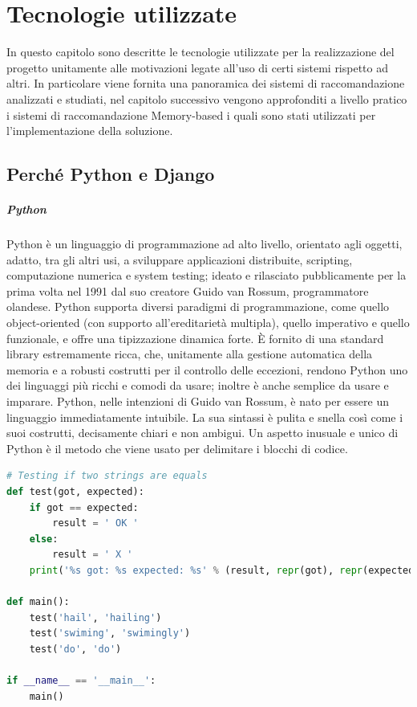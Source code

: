 \chapter{Tecnologie utilizzate}\label{chp:02-technologies}
In questo capitolo sono descritte le tecnologie utilizzate per la realizzazione del progetto unitamente alle motivazioni legate all'uso 
di certi sistemi rispetto ad altri. In particolare viene fornita una panoramica dei sistemi di raccomandazione analizzati e studiati,
nel capitolo successivo vengono approfonditi a livello pratico i sistemi di raccomandazione Memory-based i quali sono stati utilizzati 
per l'implementazione della soluzione.
%
\section{Perché Python e Django}
\paragraph{Python}
Python è un linguaggio di programmazione ad alto livello, orientato agli oggetti, adatto, tra gli altri usi, a sviluppare applicazioni 
distribuite, scripting, computazione numerica e system testing; ideato e rilasciato pubblicamente per la prima volta nel 1991 dal suo 
creatore Guido van Rossum, programmatore olandese.\hfill\break
Python supporta diversi paradigmi di programmazione, come quello object-oriented (con supporto all'ereditarietà multipla), quello 
imperativo e quello funzionale, e offre una tipizzazione dinamica forte. È fornito di una standard library estremamente ricca, che, 
unitamente alla gestione automatica della memoria e a robusti costrutti per il controllo delle eccezioni, rendono Python uno dei linguaggi 
più ricchi e comodi da usare; inoltre è anche semplice da usare e imparare. 
Python, nelle intenzioni di Guido van Rossum, è nato per essere un linguaggio immediatamente intuibile. La sua sintassi è pulita e snella 
così come i suoi costrutti, decisamente chiari e non ambigui.\hfill\break
Un aspetto inusuale e unico di Python è il metodo che viene usato per delimitare i blocchi di codice.
%
\lstset{style=python_code_style}
\begin{lstlisting}[language=Python, caption={Esempio di programma scritto in Python}]
# Testing if two strings are equals
def test(got, expected):
    if got == expected:
        result = ' OK '
    else:
        result = ' X '
    print('%s got: %s expected: %s' % (result, repr(got), repr(expected)))

def main():
    test('hail', 'hailing')
    test('swiming', 'swimingly')
    test('do', 'do')

if __name__ == '__main__':
    main()
\end{lstlisting}
